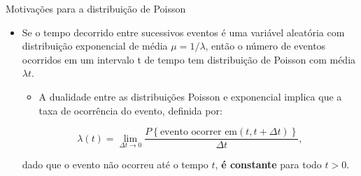 \documentclass[10pt, aspectratio=169]{beamer}
\begin{document}


\begin{frame}{Motivações para a distribuição de Poisson}

\begin{itemize}
    

        \item Se o tempo decorrido entre sucessivos eventos é uma variável aleatória com distribuição exponencial de média $\mu=1/\lambda$, então o número de eventos ocorridos em um intervalo t de tempo tem distribuição de Poisson com média $\lambda t$.
        
         \vspace{0,3cm}
         
\begin{itemize}    
        
        \item A dualidade entre as distribuições Poisson e exponencial implica que a taxa de ocorrência do evento, definida por:
        
        
\end{itemize}

    
$$
    \lambda (t) =\lim_{\Delta t\rightarrow 0}\frac{P\left \{ \text{evento ocorrer em} \left ( t,t+\Delta t \right ) \right \}}{\Delta t},
$$  

     \vspace{0,3cm}
     
dado que o evento não ocorreu até o tempo $t$, \textbf{é constante} para todo $t>0$.

        
         \end{itemize}
    
\end{frame}   



\end{document}
